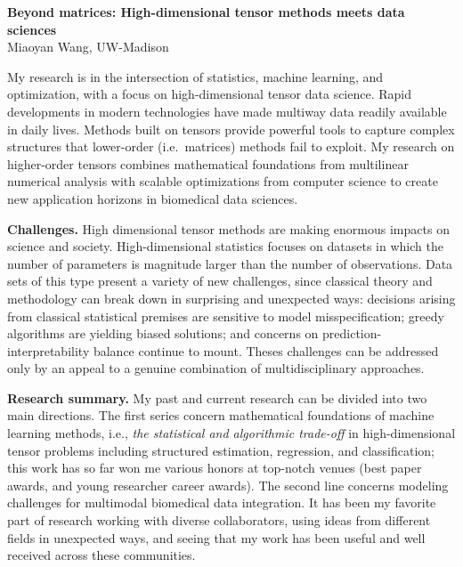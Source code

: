\documentclass[11pt]{article}
\theoremstyle{exampstyle}
\theoremstyle{definition}
\begin{document}
\begin{center}
{\bf \large Beyond matrices: High-dimensional tensor methods meets data sciences}\\
\vspace{.1cm}
Miaoyan Wang, UW-Madison
\end{center}
My research is in the intersection of statistics, machine learning, and optimization, with a focus on high-dimensional tensor data science. Rapid developments in modern technologies have made multiway data readily available in daily lives. Methods built on tensors provide powerful tools to capture complex structures that lower-order (i.e.\ matrices) methods fail to exploit. My research on higher-order tensors combines mathematical foundations from multilinear numerical analysis with scalable optimizations from computer science to create new application horizons in biomedical data sciences. 

{\bf Challenges.} High dimensional tensor methods are making enormous impacts on science and society. High-dimensional statistics focuses on datasets in which the number of parameters is magnitude larger than the number of observations. Data sets of this type present a variety of new challenges, since classical theory and methodology can break down in surprising and unexpected ways: decisions arising from classical statistical premises are sensitive to model misspecification; greedy algorithms are yielding biased solutions; and concerns on prediction-interpretability balance continue to mount. Theses challenges can be addressed only by an appeal to a genuine combination of multidisciplinary approaches. 

{\bf Research summary.} My past and current research can be divided into two main directions. The first series concern mathematical foundations of machine learning methods, i.e., \emph{the statistical and algorithmic trade-off} in high-dimensional tensor problems including structured estimation, regression, and classification; this work has so far won me various honors at top-notch venues (best paper awards, and young researcher career awards). The second line concerns modeling challenges for multimodal biomedical data integration. %
It has been my favorite part of research working with diverse collaborators, using ideas from different fields in unexpected ways, and seeing that my work has been useful and well received across these communities. 
\end{document}
